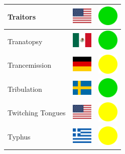 \documentclass[12pt, a4paper, twoside]{report}
\begin{document}
\begin{center}
\begin{longtable}{|p{5cm}|p{2cm}|p{2cm}|}
Traitors & \includegraphics[width=1cm]{4x3/us} & \includegraphics[width=1cm]{likes/y} \\ \hline
Tranatopsy & \includegraphics[width=1cm]{4x3/mx} & \includegraphics[width=1cm]{likes/y} \\ \hline
Trancemission & \includegraphics[width=1cm]{4x3/de} & \includegraphics[width=1cm]{likes/m} \\ \hline
Tribulation & \includegraphics[width=1cm]{4x3/se} & \includegraphics[width=1cm]{likes/y} \\ \hline
Twitching Tongues & \includegraphics[width=1cm]{4x3/us} & \includegraphics[width=1cm]{likes/m} \\ \hline
Typhus & \includegraphics[width=1cm]{4x3/gr} & \includegraphics[width=1cm]{likes/m} \\ \hline

\end{longtable}
\end{center}
\end{document}
